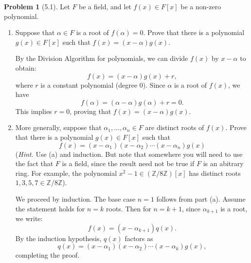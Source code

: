 \documentclass[12pt]{article}
\theoremstyle{definition}
\newtheorem{problem}{Problem}
\begin{document}
\begin{problem}[5.1]
    Let $F$ be a field, and let $f(x) \in F[x]$ be a non-zero polynomial.
    \begin{enumerate}[label=(\alph*)]
        \item Suppose that $\alpha \in F$ is a root of $f(\alpha) = 0$. Prove that there is a polynomial
              $g(x) \in F[x]$ such that $f(x) = (x - \alpha)g(x)$.

              \begin{solution}
                By the Division Algorithm for polynomials, we can divide $f(x)$ by $x - \alpha$ to obtain:
                \[
                    f(x) = (x - \alpha)g(x) + r,
                \]
                where $r$ is a constant polynomial (degree 0). Since $\alpha$ is a root of $f(x)$, we have
                \[
                    f(\alpha) = (\alpha - \alpha)g(\alpha) + r = 0.
                \]
                This implies $r = 0$, proving that $f(x) = (x - \alpha)g(x)$.
                
              \end{solution}
 
        \item More generally, suppose that $\alpha_1, \ldots, \alpha_n \in F$ are distinct roots of $f(x)$.
              Prove that there is a polynomial $g(x) \in F[x]$ such that
              \[
                  f(x) = (x - \alpha_1)(x - \alpha_2)\cdots(x - \alpha_n)g(x)
              \]
              (\textit{Hint.} Use (a) and induction. But note that somewhere you will need to use the fact
              that $F$ is a field, since the result need not be true if $F$ is an abitrary ring. For example,
              the polynomial $x^2 - 1 \in (\mathbb{Z}/8\mathbb{Z})[x]$ has distinct roots 
              $1, 3, 5, 7 \in \mathbb{Z}/8\mathbb{Z}$).

              \begin{solution}
                We proceed by induction. The base case $n=1$ follows from part (a). Assume the statement holds for $n=k$ roots. Then for $n=k+1$, since $\alpha_{k+1}$ is a root, we write:
                \[
                    f(x) = (x - \alpha_{k+1})q(x).
                \]
                By the induction hypothesis, $q(x)$ factors as
                \[
                    q(x) = (x - \alpha_1)(x - \alpha_2)\cdots(x - \alpha_k)g(x),
                \]
                completing the proof.
                
              \end{solution}
    \end{enumerate}
\end{problem}
\end{document}
